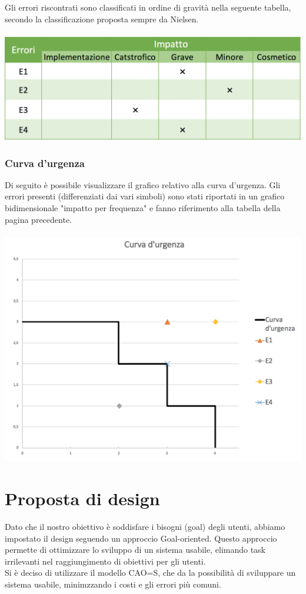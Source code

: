 \documentclass[12pt,a4paper]{report}
\begin{document}
  Gli errori riscontrati sono classificati in ordine di gravità nella seguente tabella, secondo la classificazione proposta sempre da Nielsen.\\\\
  \includegraphics[width=1\textwidth]{"Project Management Sources/ImpattoErrori"}
  \newpage
  \subsection{Curva d'urgenza}
  Di seguito è possibile visualizzare il grafico relativo alla curva d'urgenza. Gli errori presenti (differenziati dai vari simboli) sono stati riportati in un grafico bidimensionale "impatto per frequenza" e fanno riferimento alla tabella della pagina precedente.\\\\
  \includegraphics[width=1\textwidth]{"Project Management Sources/CurvaUrgenza"}
\chapter{Proposta di design}

Dato che il nostro obiettivo è soddisfare i bisogni (goal) degli utenti, abbiamo impostato il design seguendo un approccio Goal-oriented. Questo approccio permette di ottimizzare lo sviluppo di un sistema usabile, elimando task irrilevanti nel raggiungimento di obiettivi per gli utenti.\\
Si è deciso di utilizzare il modello CAO=S, che da la possibilità di sviluppare un sistema usabile, minimzzando i costi e gli errori più comuni.\\
\end{document}
